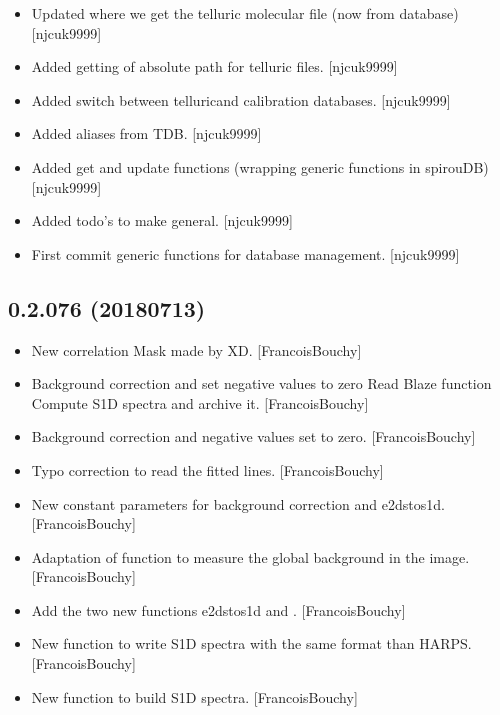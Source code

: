 \documentclass[a4paper,10pt,english]{report}
\begin{document}
\begin{itemize}
\item {} 
Updated where we get the telluric molecular file (now from database)
{[}njcuk9999{]}

\item {} 
Added getting of absolute path for telluric files. {[}njcuk9999{]}

\item {} 
Added switch between telluricand calibration databases. {[}njcuk9999{]}

\item {} 
Added aliases from TDB. {[}njcuk9999{]}

\item {} 
Added get and update functions (wrapping generic functions in
spirouDB) {[}njcuk9999{]}

\item {} 
Added todo’s to make general. {[}njcuk9999{]}

\item {} 
First commit \sphinxhyphen{} generic functions for database management. {[}njcuk9999{]}

\end{itemize}


\subsection{0.2.076 (2018\sphinxhyphen{}07\sphinxhyphen{}13)}
\label{\detokenize{misc/changelog:id413}}\begin{itemize}
\item {} 
New correlation Mask made by XD. {[}FrancoisBouchy{]}

\item {} 
Background correction and set negative values to zero Read Blaze
function Compute S1D spectra and archive it. {[}FrancoisBouchy{]}

\item {} 
Background correction and negative values set to zero.
{[}FrancoisBouchy{]}

\item {} 
Typo correction to read the fitted lines. {[}FrancoisBouchy{]}

\item {} 
New constant parameters for background correction and e2dstos1d.
{[}FrancoisBouchy{]}

\item {} 
Adaptation of function to measure the global background in the image.
{[}FrancoisBouchy{]}

\item {} 
Add the two new functions e2dstos1d and . {[}FrancoisBouchy{]}

\item {} 
New function to write S1D spectra with the same format than HARPS.
{[}FrancoisBouchy{]}

\item {} 
New function to build S1D spectra. {[}FrancoisBouchy{]}

\end{itemize}
\end{document}
